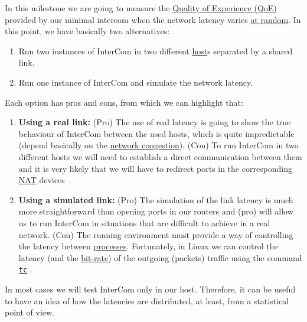 In this milestone we are going to measure the
\href{https://en.wikipedia.org/wiki/Quality_of_experience}{Quality of
  Experience (QoE)} provided by our minimal intercom when the network
latency varies \href{https://en.wikipedia.org/wiki/Randomness}{at
  random}. In this point, we have basically two alternatives:
\begin{enumerate}
\item Run two instances of InterCom in two different
  \href{https://en.wikipedia.org/wiki/Host_(network)}{host}s separated
  by a shared link.
\item Run one instance of InterCom and simulate the network latency.
\end{enumerate}
Each option has pros and cons, from which we can highlight that:
\begin{enumerate}
\item \textbf{Using a real link:} (Pro) The use of real latency is
  going to show the true behaviour of InterCom between the used hosts,
  which is quite impredictable (depend basically on the
  \href{https://en.wikipedia.org/wiki/Network_congestion}{network
    congestion}). (Con) To run InterCom in two different hosts we will
  need to establish a direct communication between them and it is very
  likely that we will have to redirect ports in the corresponding
  \href{https://en.wikipedia.org/wiki/Network_address_translation}{NAT}
  devices~\cite{srisuresh1999nat}.
\item \textbf{Using a simulated link:} (Pro) The simulation of the
  link latency is much more straightforward than opening ports in our
  routers and (pro) will allow us to run InterCom in situations that
  are difficult to achieve in a real network. (Con) The running
  environment must provide a way of controlling the latency between
  \href{https://en.wikipedia.org/wiki/Process_(computing)}{processes}. Fortunately,
  in Linux we can control the latency (and the
  \href{https://en.wikipedia.org/wiki/Bit_rate}{bit-rate}) of the
  outgoing (packets) traffic using the command
  \href{https://man7.org/linux/man-pages/man8/tc.8.html}{\texttt{tc}}
  \cite{bert2012lartc}.
\end{enumerate}

In most cases we will test InterCom only in our host. Therefore, it
can be useful to have an idea of how the latencies are distributed, at
least, from a statistical point of view.

